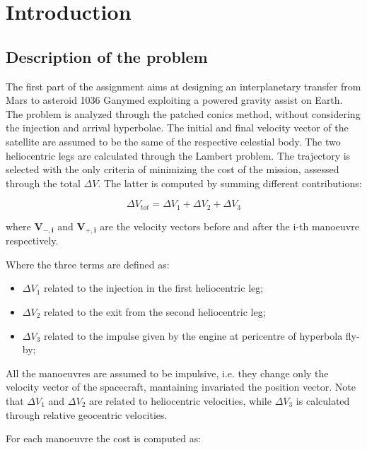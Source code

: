 \section{Introduction}
\label{sec:introduction}

\subsection{Description of the problem}
\label{subsec:description}

The first part of the assignment aims at designing an interplanetary transfer from Mars to asteroid 1036 Ganymed exploiting a powered gravity assist on Earth. The problem is analyzed through the patched conics method, without considering the injection and arrival hyperbolae. The initial and final velocity vector of the satellite are assumed to be the same of the respective celestial body. The two heliocentric legs are calculated through the Lambert problem. The trajectory is selected with the only criteria of minimizing the cost of the mission, assessed through the total $\Delta V$. The latter is computed by summing different contributions:

\begin{equation}
    \Delta V_{tot}= \Delta V_1 + \Delta V_2 + \Delta V_3
\end{equation}

where $\boldsymbol{V_{-,i}}$ and $\boldsymbol{V_{+,i}}$ are the velocity vectors before and after the i-th manoeuvre respectively.

Where the three terms are defined as:

\begin{itemize}
    [wide,itemsep=3pt,topsep=3pt]
    \item $\Delta V_1$ related to the injection in the first heliocentric leg;
    \item $\Delta V_2$ related to the exit from the second heliocentric leg;
    \item $\Delta V_3$ related to the impulse given by the engine at pericentre of hyperbola fly-by;
\end{itemize}

All the manoeuvres are assumed to be impulsive, i.e. they change only the velocity vector of the spacecraft, mantaining invariated the position vector. Note that $\Delta V_{1}$ and $\Delta V_{2}$ are related to heliocentric velocities, while $\Delta V_{3}$ is calculated through relative geocentric velocities. 

For each manoeuvre the cost is computed as:

